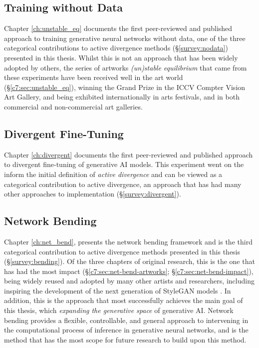 \subsection{Training without Data}

Chapter \ref{ch:unstable_eq} documents the first peer-reviewed and published approach to training generative neural networks without data, one of the three categorical contributions to active divergence methods (\S \ref{survey:nodata}) presented in this thesis.
Whilst this is not an approach that has been widely adopted by others, the series of artworks \textit{(un)stable equilibrium} that came from these experiments have been received well in the art world (\S \ref{c7:sec:unstable_eq}), winning the Grand Prize in the ICCV Compter Vision Art Gallery, and being exhibited internationally in arts festivals, and in both commercial and non-commercial art galleries. 

\subsection{Divergent Fine-Tuning}

Chapter \ref{ch:divergent} documents the first peer-reviewed and published approach to divergent fine-tuning of generative AI models.
This experiment went on the inform the initial definition of \textit{active divergence} \citep{berns2020bridging} and can be viewed as a categorical contribution to active divergence, an approach that has had many other approaches to implementation (\S \ref{survey:divergent}).


\subsection{Network Bending}

Chapter \ref{ch:net_bend}, presents the network bending framework and is the third categorical contribution to active divergence methods presented in this thesis (\S \ref{survey:bending}).
Of the three chapters of original research, this is the one that has had the most impact (\S \ref{c7:sec:net-bend-artworks}; \S \ref{c7:sec:net-bend-impact}), being widely reused and adopted by many other artists and researchers, including inspiring the development of the next generation of StyleGAN models \citep{karras2021alias}.
In addition, this is the approach that most successfully achieves the main goal of this thesis, which \textit{expanding the generative space} of generative AI. 
Network bending provides a flexible, controllable, and general approach to intervening in the computational process of inference in generative neural networks, and is the method that has the most scope for future research to build upon this method.

